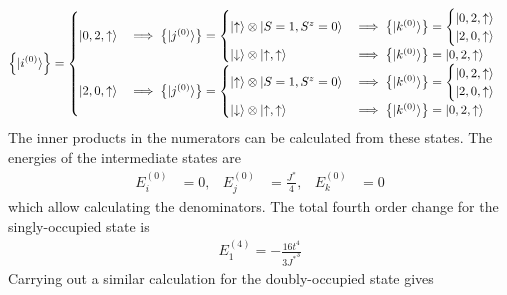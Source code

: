 \documentclass[twoside,11pt]{report}
\numberwithin{equation}{section}
\begin{document}
\begin{equation}\begin{aligned}
	\left\{ \ket{i^{(0)}} \right\} = \begin{cases}
		\ket{0, 2, \uparrow} &\implies \left\{ \ket{j^{(0)}}\right\} = \begin{cases}
			\ket{\uparrow}\otimes\ket{S=1,S^z=0} &\implies \left\{\ket{k^{(0)}}\right\} = \begin{cases}
		\ket{0, 2, \uparrow}	\\
		\ket{2, 0, \uparrow}
		\end{cases}\\
				\ket{\downarrow}\otimes\ket{\uparrow,\uparrow} &\implies \left\{\ket{k^{(0)}}\right\} = \ket{0, 2, \uparrow}\\
	\end{cases} \\
			\ket{2, 0, \uparrow}&\implies \left\{ \ket{j^{(0)}}\right\} = \begin{cases}
			\ket{\uparrow}\otimes\ket{S=1,S^z=0} &\implies \left\{\ket{k^{(0)}}\right\} = \begin{cases}
		\ket{0, 2, \uparrow}	\\
		\ket{2, 0, \uparrow}
		\end{cases}\\
				\ket{\downarrow}\otimes\ket{\uparrow,\uparrow} &\implies \left\{\ket{k^{(0)}}\right\} = \ket{0, 2, \uparrow}\\
	\end{cases} \\
	\end{cases}\\
\end{aligned}\end{equation}
The inner products in the numerators can be calculated from these states. The energies of the intermediate states are
\begin{equation}\begin{aligned}
	E^{(0)}_i &=0, &E^{(0)}_j &= \frac{J^*}{4}, &E^{(0)}_k &= 0
\end{aligned}\end{equation}
which allow calculating the denominators. The total fourth order change for the singly-occupied state is
\begin{equation}\begin{aligned}
E_1^{(4)} = -\frac{16t^4}{3{J^*}^3}
\end{aligned}\end{equation}
Carrying out a similar calculation for the doubly-occupied state gives
\end{document}
